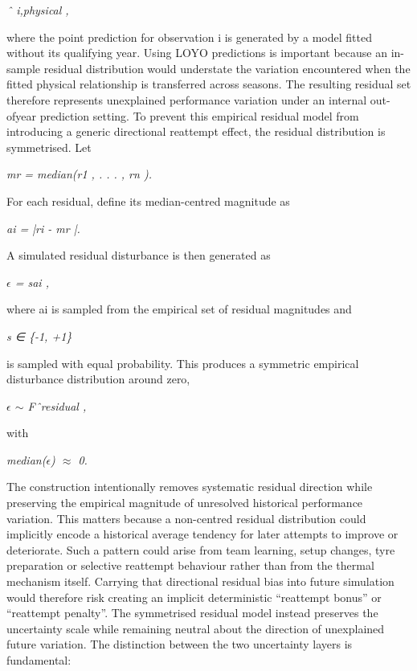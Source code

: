 \begin{center}\textit{ˆ i,physical ,}\end{center}

where the point prediction for observation i is generated by a model fitted without its qualifying year. Using LOYO predictions is important because an in-sample residual distribution would understate the variation encountered when the fitted physical relationship is transferred across seasons. The resulting residual set therefore represents unexplained performance variation under an internal out-ofyear prediction setting. To prevent this empirical residual model from introducing a generic directional reattempt effect, the residual distribution is symmetrised. Let

\begin{center}\textit{mr = median(r1 , . . . , rn ).}\end{center}

For each residual, define its median-centred magnitude as

\begin{center}\textit{ai = |ri - mr |.}\end{center}

A simulated residual disturbance is then generated as

\begin{center}\textit{\ensuremath{\epsilon} = sai ,}\end{center}

where ai is sampled from the empirical set of residual magnitudes and

\begin{center}\textit{s ∈ \{-1, +1\}}\end{center}

is sampled with equal probability. This produces a symmetric empirical disturbance distribution around zero,

\begin{center}\textit{\ensuremath{\epsilon} \ensuremath{\sim} Fˆresidual ,}\end{center}

with

\begin{center}\textit{median(\ensuremath{\epsilon}) \ensuremath{\approx} 0.}\end{center}

The construction intentionally removes systematic residual direction while preserving the empirical magnitude of unresolved historical performance variation. This matters because a non-centred residual distribution could implicitly encode a historical average tendency for later attempts to improve or deteriorate. Such a pattern could arise from team learning, setup changes, tyre preparation or selective reattempt behaviour rather than from the thermal mechanism itself. Carrying that directional residual bias into future simulation would therefore risk creating an implicit deterministic ``reattempt bonus'' or ``reattempt penalty''. The symmetrised residual model instead preserves the uncertainty scale while remaining neutral about the direction of unexplained future variation. The distinction between the two uncertainty layers is fundamental:

